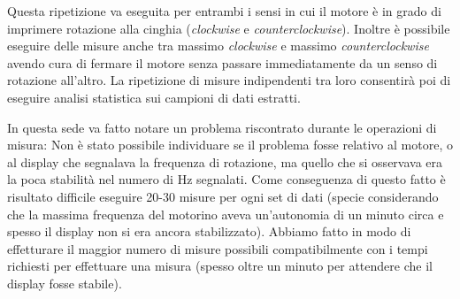 \documentclass[a4paper,11pt]{article}
\begin{document}
Questa ripetizione va eseguita per entrambi i sensi in cui il motore è in grado di imprimere rotazione alla cinghia (\textit{clockwise} e \textit{counterclockwise}). Inoltre è possibile eseguire delle misure anche tra massimo \textit{clockwise} e massimo \textit{counterclockwise} avendo cura di fermare il motore senza passare immediatamente da un senso di rotazione all'altro. La ripetizione di misure indipendenti tra loro consentirà poi di eseguire analisi statistica sui campioni di dati estratti.

In questa sede va fatto notare un problema riscontrato durante le operazioni di misura: Non è stato possibile individuare se il problema fosse relativo al motore, o al display che segnalava la frequenza di rotazione, ma quello che si osservava era la poca stabilità nel numero di Hz segnalati. Come conseguenza di questo fatto è risultato difficile eseguire 20-30 misure per ogni set di dati (specie considerando che la massima frequenza del motorino aveva un'autonomia di un minuto circa e spesso il display non si era ancora stabilizzato). Abbiamo fatto in modo di effetturare il maggior numero di misure possibili compatibilmente con i tempi richiesti per effettuare una misura (spesso oltre un minuto per attendere che il display fosse stabile).
\end{document}
